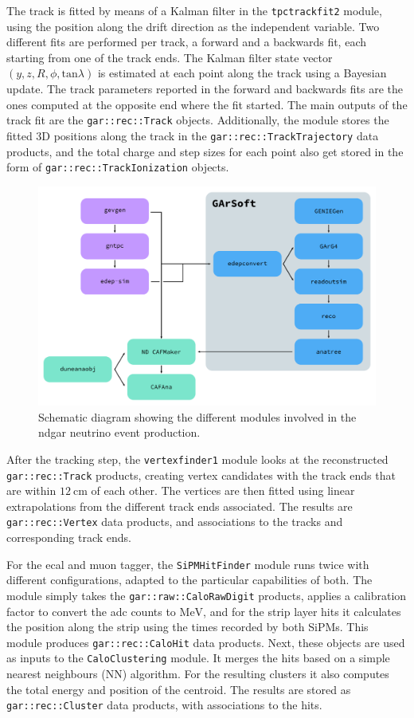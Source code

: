 The track is fitted by means of a Kalman filter in the \texttt{tpctrackfit2} module, using the position along the drift direction as the independent variable. Two different fits are performed per track, a forward and a backwards fit, each starting from one of the track ends. The Kalman filter state vector $(y,z,R,\phi,\mathrm{tan}\lambda)$ is estimated at each point along the track using a Bayesian update. The track parameters reported in the forward and backwards fits are the ones computed at the opposite end where the fit started. The main outputs of the track fit are the \texttt{gar::rec::Track} objects. Additionally, the module stores the fitted 3D positions along the track in the \texttt{gar::rec::TrackTrajectory} data products, and the total charge and step sizes for each point also get stored in the form of \texttt{gar::rec::TrackIonization} objects.

\begin{figure}[t]
	\centering
	\includegraphics[width=.90\linewidth]{Images/GArSoft_PID/gar_workflow.pdf}
	\caption{Schematic diagram showing the different modules involved in the \gls{ndgar} neutrino event production.}
	\label{fig:gar_workflow}
\end{figure}

After the tracking step, the \texttt{vertexfinder1} module looks at the reconstructed \texttt{gar::rec::Track} products, creating vertex candidates with the track ends that are within $12~\mathrm{cm}$ of each other. The vertices are then fitted using linear extrapolations from the different track ends associated. The results are \texttt{gar::rec::Vertex} data products, and associations to the tracks and corresponding track ends.

For the \gls{ecal} and muon tagger, the \texttt{SiPMHitFinder} module runs twice with different configurations, adapted to the particular capabilities of both. The module simply takes the \texttt{gar::raw::CaloRawDigit} products, applies a calibration factor to convert the \gls{adc} counts to $\mathrm{MeV}$, and for the strip layer hits it calculates the position along the strip using the times recorded by both SiPMs. This module produces \texttt{gar::rec::CaloHit} data products. Next, these objects are used as inputs to the \texttt{CaloClustering} module. It merges the hits based on a simple nearest neighbours (NN) algorithm. For the resulting clusters it also computes the total energy and position of the centroid. The results are stored as \texttt{gar::rec::Cluster} data products, with associations to the hits.

